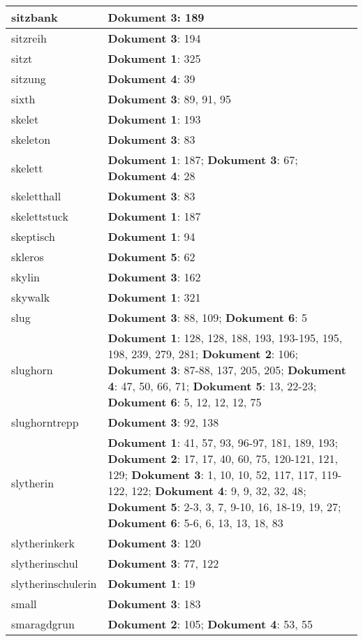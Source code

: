 \documentclass[a5paper]{article}
\begin{document}
\begin{longtable}[l]{|l|p{3in}|}
\hline
sitzbank & \textbf{Dokument 3}: 189 \\
\hline
sitzreih & \textbf{Dokument 3}: 194 \\
\hline
sitzt & \textbf{Dokument 1}: 325 \\
\hline
sitzung & \textbf{Dokument 4}: 39 \\
\hline
sixth & \textbf{Dokument 3}: 89, 91, 95 \\
\hline
skelet & \textbf{Dokument 1}: 193 \\
\hline
skeleton & \textbf{Dokument 3}: 83 \\
\hline
skelett & \textbf{Dokument 1}: 187; \textbf{Dokument 3}: 67; \textbf{Dokument 4}: 28 \\
\hline
skeletthall & \textbf{Dokument 3}: 83 \\
\hline
skelettstuck & \textbf{Dokument 1}: 187 \\
\hline
skeptisch & \textbf{Dokument 1}: 94 \\
\hline
skleros & \textbf{Dokument 5}: 62 \\
\hline
skylin & \textbf{Dokument 3}: 162 \\
\hline
skywalk & \textbf{Dokument 1}: 321 \\
\hline
slug & \textbf{Dokument 3}: 88, 109; \textbf{Dokument 6}: 5 \\
\hline
slughorn & \textbf{Dokument 1}: 128, 128, 188, 193, 193-195, 195, 198, 239, 279, 281; \textbf{Dokument 2}: 106; \textbf{Dokument 3}: 87-88, 137, 205, 205; \textbf{Dokument 4}: 47, 50, 66, 71; \textbf{Dokument 5}: 13, 22-23; \textbf{Dokument 6}: 5, 12, 12, 12, 75 \\
\hline
slughorntrepp & \textbf{Dokument 3}: 92, 138 \\
\hline
slytherin & \textbf{Dokument 1}: 41, 57, 93, 96-97, 181, 189, 193; \textbf{Dokument 2}: 17, 17, 40, 60, 75, 120-121, 121, 129; \textbf{Dokument 3}: 1, 10, 10, 52, 117, 117, 119-122, 122; \textbf{Dokument 4}: 9, 9, 32, 32, 48; \textbf{Dokument 5}: 2-3, 3, 7, 9-10, 16, 18-19, 19, 27; \textbf{Dokument 6}: 5-6, 6, 13, 13, 18, 83 \\
\hline
slytherinkerk & \textbf{Dokument 3}: 120 \\
\hline
slytherinschul & \textbf{Dokument 3}: 77, 122 \\
\hline
slytherinschulerin & \textbf{Dokument 1}: 19 \\
\hline
small & \textbf{Dokument 3}: 183 \\
\hline
smaragdgrun & \textbf{Dokument 2}: 105; \textbf{Dokument 4}: 53, 55 \\

\end{longtable}
\end{document}
